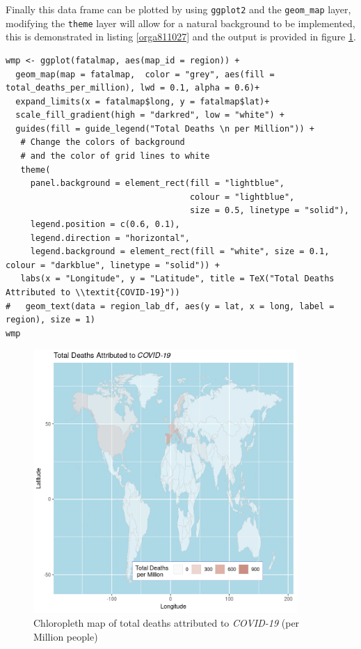 \documentclass[11pt]{article}
\begin{document}
Finally this data frame can be plotted by using \texttt{ggplot2} and the \texttt{geom\_map}
layer, modifying the \texttt{theme} layer will allow for a natural background to be implemented,
this is demonstrated in listing \ref{orga811027} and the output is provided in figure \ref{fig:orgb9d1c6a}.

\begin{listing}[htbp]
\begin{verbatim}
wmp <- ggplot(fatalmap, aes(map_id = region)) +
  geom_map(map = fatalmap,  color = "grey", aes(fill = total_deaths_per_million), lwd = 0.1, alpha = 0.6)+
  expand_limits(x = fatalmap$long, y = fatalmap$lat)+
  scale_fill_gradient(high = "darkred", low = "white") +
  guides(fill = guide_legend("Total Deaths \n per Million")) +
   # Change the colors of background
   # and the color of grid lines to white
   theme(
     panel.background = element_rect(fill = "lightblue",
                                     colour = "lightblue",
                                     size = 0.5, linetype = "solid"),
     legend.position = c(0.6, 0.1),
     legend.direction = "horizontal",
     legend.background = element_rect(fill = "white", size = 0.1, colour = "darkblue", linetype = "solid")) +
   labs(x = "Longitude", y = "Latitude", title = TeX("Total Deaths Attributed to \\textit{COVID-19}"))
#   geom_text(data = region_lab_df, aes(y = lat, x = long, label = region), size = 1)
wmp

\end{verbatim}
\caption{\label{orga811027}use \texttt{ggplot2} to create a chloropleth map from data, output in figure \ref{fig:orgb9d1c6a}}
\end{listing}


\begin{figure}[htbp]
\centering
\includegraphics[width=10cm]{FirstChALL.png}
\caption{\label{fig:orgb9d1c6a}Chloropleth map of total deaths attributed to \emph{COVID-19} (per Million people)}
\end{figure}
\end{document}
